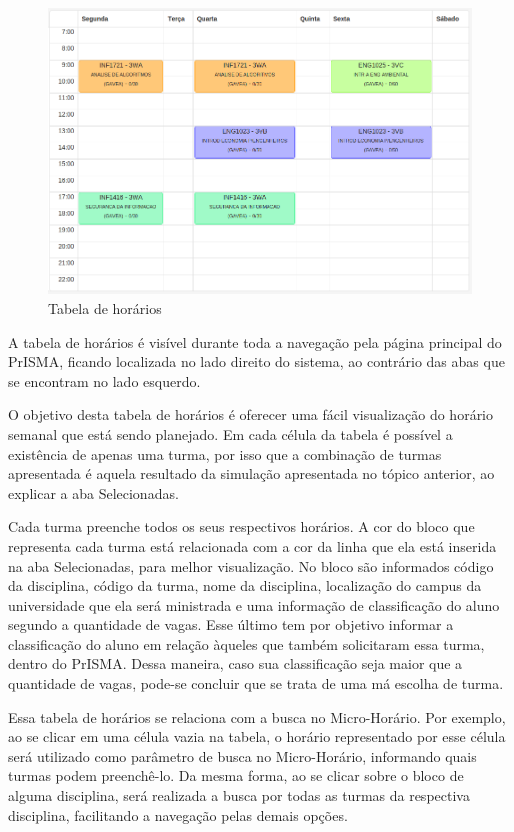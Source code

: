 \documentclass[graduacao,brazil]{ThesisPUC}
\begin{document}
\begin{figure}[H]
    \centering
    \includegraphics[width=\linewidth]{img/v3_tabela_horarios.png}
    \caption{Tabela de horários}
\end{figure}

A tabela de horários é visível durante toda a navegação pela página principal do PrISMA, ficando localizada no lado direito do sistema, ao contrário das abas que se encontram no lado esquerdo. 

O objetivo desta tabela de horários é oferecer uma fácil visualização do horário semanal que está sendo planejado. Em cada célula da tabela é possível a existência de apenas uma turma, por isso que a combinação de turmas apresentada é aquela resultado da simulação apresentada no tópico anterior, ao explicar a aba Selecionadas. 

Cada turma preenche todos os seus respectivos horários. A cor do bloco que representa cada turma está relacionada com a cor da linha que ela está inserida na aba Selecionadas, para melhor visualização. No bloco são informados código da disciplina, código da turma, nome da disciplina, localização do campus da universidade que ela será ministrada e uma informação de classificação do aluno segundo a quantidade de vagas. Esse último tem por objetivo informar a classificação do aluno em relação àqueles que também solicitaram essa turma, dentro do PrISMA. Dessa maneira, caso sua classificação seja maior que a quantidade de vagas, pode-se concluir que se trata de uma má escolha de turma. 

Essa tabela de horários se relaciona com a busca no Micro-Horário. Por exemplo, ao se clicar em uma célula vazia na tabela, o horário representado por esse célula será utilizado como parâmetro de busca no Micro-Horário, informando quais turmas podem preenchê-lo. Da mesma forma, ao se clicar sobre o bloco de alguma disciplina, será realizada a busca por todas as turmas da respectiva disciplina, facilitando a navegação pelas demais opções.
\end{document}
